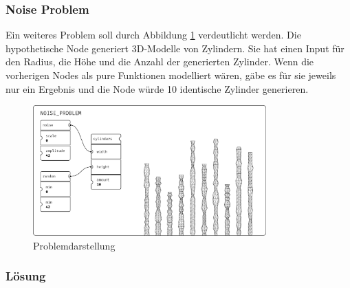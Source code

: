 \documentclass[ngerman]{article}
\begin{document}
\pagebreak

\subsubsection*{Noise Problem}

Ein weiteres Problem soll durch Abbildung \ref{fig:noise_problem} verdeutlicht werden. 
Die hypothetische  Node generiert 3D-Modelle von Zylindern. Sie hat einen Input für den Radius, die Höhe und die Anzahl der generierten Zylinder. 
\br
Wenn die vorherigen Nodes als pure Funktionen modelliert wären, gäbe es für sie jeweils nur ein Ergebnis und die  Node würde 10 identische Zylinder generieren.

\begin{figure}[htbp]
  \centering
  \includegraphics[width=0.8\textwidth]{./graphics/NOISE_PROBLEM.pdf}
  \caption{Problemdarstellung}
  \label{fig:noise_problem}
\end{figure}

\subsubsection*{Lösung}
\end{document}
